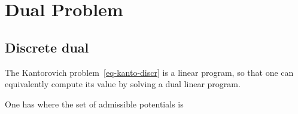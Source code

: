 
\section{Dual Problem}

\subsection{Discrete dual}


The Kantorovich problem~\eqref{eq-kanto-discr} is a linear program, so that one can equivalently compute its value by solving a dual linear program. 


\begin{prop}\label{prop-duality-discr}
One has
\eql{\label{eq-dual}
	\MKD_\C(\a,\b) = 
	\umax{(\fD,\gD) \in \PotentialsD(\a,\b)} \dotp{\fD}{\a} + \dotp{\gD}{\b} 
}
where the set of admissible potentials is
\end{prop}

